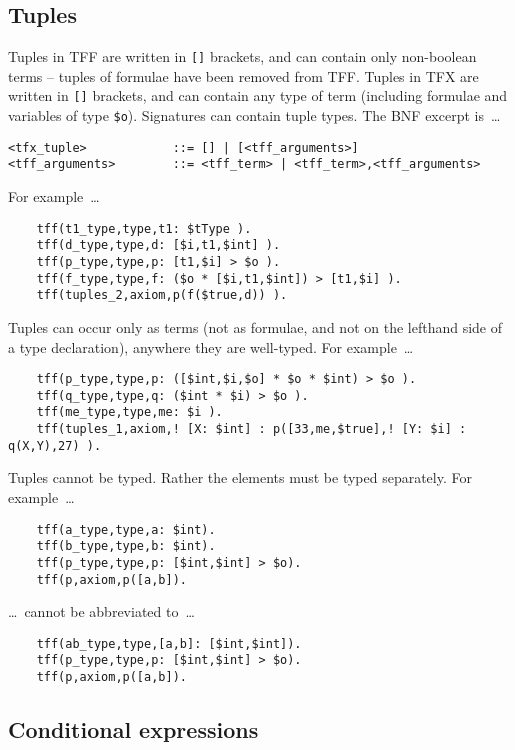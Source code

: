 \documentclass{easychair}
\begin{document}
\subsection{Tuples}

Tuples in TFF are written in {\tt []} brackets, and can contain only
non-boolean terms -- tuples of formulae have been removed from TFF. 
Tuples in TFX are written in {\tt []} brackets, and can contain any type of 
term (including formulae and variables of type {\tt \$o}). 
Signatures can contain tuple types. 
The BNF excerpt is~\ldots
\begin{verbatim}
<tfx_tuple>            ::= [] | [<tff_arguments>]
<tff_arguments>        ::= <tff_term> | <tff_term>,<tff_arguments>
\end{verbatim}
For example~\ldots
\begin{verbatim}
    tff(t1_type,type,t1: $tType ).
    tff(d_type,type,d: [$i,t1,$int] ).
    tff(p_type,type,p: [t1,$i] > $o ).
    tff(f_type,type,f: ($o * [$i,t1,$int]) > [t1,$i] ).
    tff(tuples_2,axiom,p(f($true,d)) ).
\end{verbatim}
Tuples can occur only as terms (not as formulae, and not on the lefthand side 
of a type declaration), anywhere they are well-typed. 
For example~\ldots
\begin{verbatim}
    tff(p_type,type,p: ([$int,$i,$o] * $o * $int) > $o ).
    tff(q_type,type,q: ($int * $i) > $o ).
    tff(me_type,type,me: $i ).
    tff(tuples_1,axiom,! [X: $int] : p([33,me,$true],! [Y: $i] : q(X,Y),27) ).
\end{verbatim}
Tuples cannot be typed. Rather the elements must be typed separately. 
For example~\ldots
\begin{verbatim}
    tff(a_type,type,a: $int).
    tff(b_type,type,b: $int).
    tff(p_type,type,p: [$int,$int] > $o).
    tff(p,axiom,p([a,b]).
\end{verbatim}
\ldots~cannot be abbreviated to~\ldots
\begin{verbatim}
    tff(ab_type,type,[a,b]: [$int,$int]).
    tff(p_type,type,p: [$int,$int] > $o).
    tff(p,axiom,p([a,b]).
\end{verbatim}

\subsection{Conditional expressions}
\end{document}
